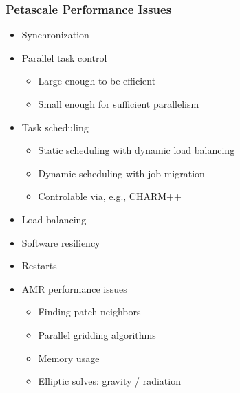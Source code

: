\documentclass{beamer}
\begin{document}
    \begin{frame}[fragile] \frametitle{Petascale Performance Issues}
      \begin{itemize}
        \item Synchronization
        \item Parallel task control
        \begin{itemize}
          \item Large enough to be efficient
          \item Small enough for sufficient parallelism
        \end{itemize}
        \item Task scheduling
        \begin{itemize}
          \item Static scheduling with dynamic load balancing
          \item Dynamic scheduling with job migration
          \item Controlable via, e.g., CHARM++
        \end{itemize}
        \item Load balancing
        \item Software resiliency
        \item Restarts
        \item AMR performance issues
        \begin{itemize}
          \item Finding patch neighbors
          \item Parallel gridding algorithms
          \item Memory usage
          \item Elliptic solves: gravity / radiation
        \end{itemize}
      \end{itemize}
\end{frame}
\end{document}
